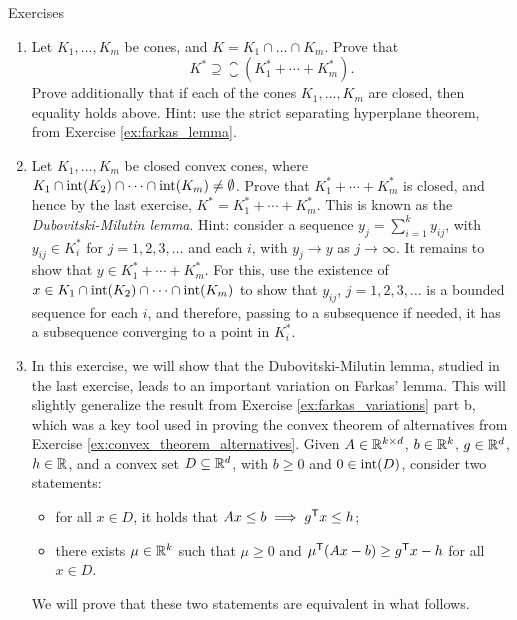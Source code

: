 \begin{xcb}{Exercises}
\begin{enumerate}[label=\thechapter.\arabic*]

\item Let $K_1,\dots,K_m$ be cones, and $K = K_1 \cap \dots \cap K_m$. Prove
  that 
  \[
  K^* \supseteq \closure(K_1^* + \cdots + K_m^*).
  \]
  Prove additionally that if each of the cones $K_1,\dots,K_m$ are closed, then
  equality holds above. Hint: use the strict separating hyperplane theorem, from
  Exercise \ref{ex:farkas_lemma}.

\item \label{ex:dubovitski_milutin_lemma}
  Let $K_1,\dots,K_m$ be closed convex cones, where $K_1 \cap \operatorname{int}(K_2) 
  \cap \cdots \cap \operatorname{int}(K_m) \not= \emptyset$. Prove that $K_1 ^* + \cdots
  + K_m^*$ is closed, and hence by the last exercise, $K^* = K_1^* + \cdots
  + K_m^*$. This is known as the \emph{Dubovitski-Milutin lemma}. Hint: consider
  a sequence $y_j = \sum_{i=1}^k y_{ij}$, with $y_{ij} \in K_i^*$ for $j =
  1,2,3,\dots$ and each $i$, with $y_j \to y$ as $j \to \infty$. It remains to
  show that $y \in K_1^* + \cdots + K_m^*$. For this, use the existence of $x
  \in K_1 \cap \operatorname{int}(K_2) \cap \cdots \cap \operatorname{int}(K_m)$ to show that
  $y_{ij}$, $j = 1,2,3,\dots$ is a bounded sequence for each $i$, and therefore, 
  passing to a subsequence if needed, it has a subsequence converging to a point
  in $K_i^*$. 

\item \label{ex:farkas_variations_conic} 
  In this exercise, we will show that the Dubovitski-Milutin lemma, studied in
  the last exercise, leads to an important variation on Farkas' lemma. This will 
  slightly generalize the result from Exercise \ref{ex:farkas_variations} part
  b, which was a key tool used in proving the convex theorem of alternatives
  from Exercise \ref{ex:convex_theorem_alternatives}. Given $A \in \mathbb{R}^{k \times
    d}$, $b \in \mathbb{R}^k$, $g \in \mathbb{R}^d$, $h \in \mathbb{R}$, and a convex set $D \subseteq
  \mathbb{R}^d$, with $b \geq 0$ and $0 \in \operatorname{int}(D)$, consider two statements:       
  \begin{itemize}
  \item for all $x \in D$, it holds that $Ax \leq b \implies g^{\mathsf{T}} x \leq h$;  
  \item there exists $\mu \in \mathbb{R}^k$ such that $\mu \geq 0$ and $\mu^{\mathsf{T}} (Ax - b) 
    \geq g^{\mathsf{T}} x - h$ for all $x \in D$.
  \end{itemize}
  We will prove that these two statements are equivalent in what follows.
  

\end{enumerate}
\end{xcb}
